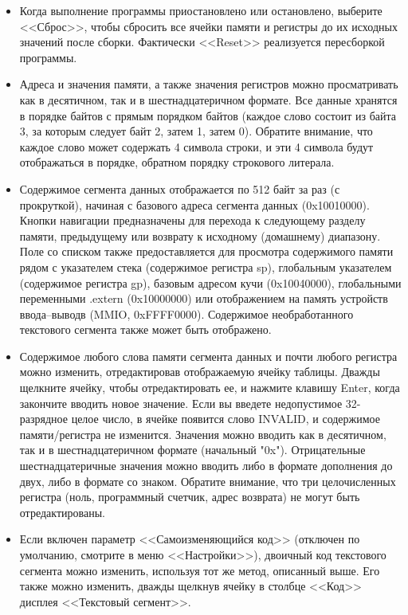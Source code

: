 \begin{itemize}
    \item Когда выполнение программы приостановлено или остановлено, выберите <<Сброс>>, чтобы сбросить все ячейки памяти и регистры до их исходных значений после сборки. Фактически <<Reset>> реализуется пересборкой программы.
    \item Адреса и значения памяти, а также значения регистров можно просматривать как в десятичном, так и в шестнадцатеричном формате. Все данные хранятся в порядке байтов с прямым порядком байтов (каждое слово состоит из байта 3, за которым следует байт 2, затем 1, затем 0). Обратите внимание, что каждое слово может содержать 4 символа строки, и эти 4 символа будут отображаться в порядке, обратном порядку строкового литерала.
    \item Содержимое сегмента данных отображается по 512 байт за раз (с прокруткой), начиная с базового адреса сегмента данных (0x10010000). Кнопки навигации предназначены для перехода к следующему разделу памяти, предыдущему или возврату к исходному (домашнему) диапазону. Поле со списком также предоставляется для просмотра содержимого памяти рядом с указателем стека (содержимое регистра sp), глобальным указателем (содержимое регистра gp), базовым адресом кучи (0x10040000), глобальными переменными .extern (0x10000000) или отображением на память устройств ввода--выводв (MMIO, 0xFFFF0000). Содержимое необработанного текстового сегмента также может быть отображено.
    \item Содержимое любого слова памяти сегмента данных и почти любого регистра можно изменить, отредактировав отображаемую ячейку таблицы. Дважды щелкните ячейку, чтобы отредактировать ее, и нажмите клавишу Enter, когда закончите вводить новое значение. Если вы введете недопустимое 32-разрядное целое число, в ячейке появится слово INVALID, и содержимое памяти/регистра не изменится. Значения можно вводить как в десятичном, так и в шестнадцатеричном формате (начальный "0x"). Отрицательные шестнадцатеричные значения можно вводить либо в формате дополнения до двух, либо в формате со знаком. Обратите внимание, что три целочисленных регистра (ноль, программный счетчик, адрес возврата) не могут быть отредактированы.
    \item Если включен параметр <<Самоизменяющийся код>> (отключен по умолчанию, смотрите в меню <<Настройки>>), двоичный код текстового сегмента можно изменить, используя тот же метод, описанный выше. Его также можно изменить, дважды щелкнув ячейку в столбце <<Код>> дисплея <<Текстовый сегмент>>.

\end{itemize}
